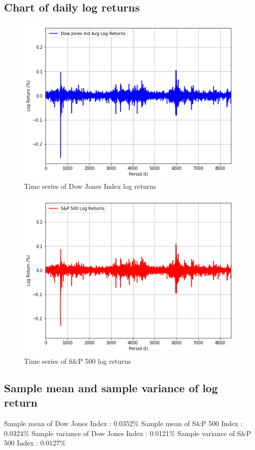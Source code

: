 \documentclass[a4paper]{article}
\begin{document}
\newpage
\subsection{Chart of daily log returns}

\begin{figure}[h!]
	\centering
	\includegraphics[width=0.8\linewidth]{DJI_logret.png}
	\caption{Time series of Dow Jones Index log returns}
\end{figure}
\begin{figure}[h!]
	\centering
	\includegraphics[width=0.8\linewidth]{SP_logret.png}
	\caption{Time series of S\&P 500 log returns}
\end{figure}

\subsection{Sample mean and sample variance of log return}
\begin{flushleft}
Sample mean of Dow Jones Index : 0.0352\%  \linebreak 
Sample mean of S\&P 500 Index : 0.0324\%  \linebreak 
Sample variance of Dow Jones Index : 0.0121\%  \linebreak 
Sample variance of S\&P 500 Index : 0.0127\%  \linebreak 
\end{flushleft}
\end{document}
